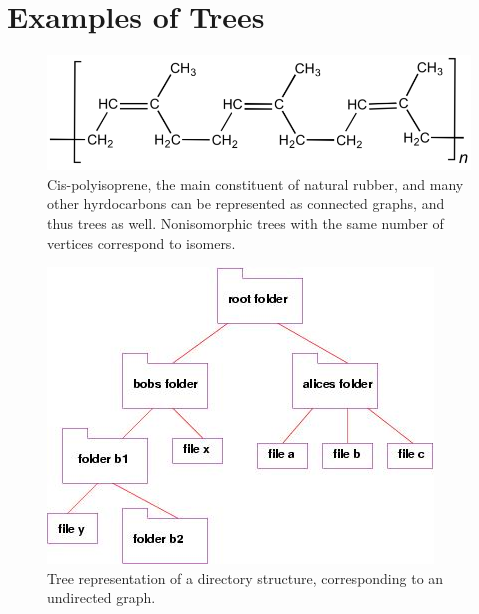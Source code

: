 \documentclass[a4paper,10pt]{article}
\title{}
\author{Zack Garza}
\begin{document}
\section{Examples of Trees}
\begin{figure}[H]
	\begin{centering}
	\begin{center}
	\includegraphics[width=\linewidth]{./chemistry.png}
	\caption{Cis-polyisoprene, the main constituent of natural rubber, and many other hyrdocarbons can be represented as connected graphs, and thus trees as well. Nonisomorphic trees with the same number of vertices correspond to isomers.}
	\label{fig:chem}
	\end{center}
	\par\end{centering}
\end{figure}

\begin{figure}[H]
	\begin{centering}
	\begin{center}
	\includegraphics[width=\textwidth]{./tree.png}
	\caption{Tree representation of a directory structure, corresponding to an undirected graph.}
	\label{fig:directory}
	\end{center}
	\par\end{centering}
\end{figure}
\end{document}
